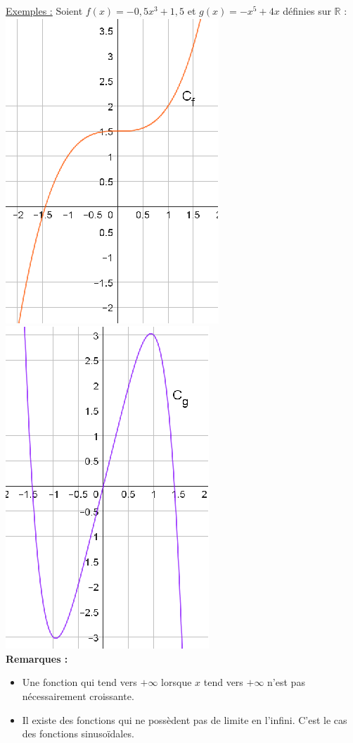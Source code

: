 \documentclass[a4paper,12pt,twoside,french]{extarticle}
\newcommand{\R}{\ensuremath{\mathbb{R}}\xspace}
\newcommand{\bi}{\begin{itemize}}
\newcommand{\ei}{\end{itemize}}
\newcommand{\rems }{ {\sffamily \textbf{Remarques : }}}
\begin{document}
\underline{Exemples :} Soient  $f(x)=-0,5x^3+1,5$ et $g(x)=-x^5+4x$ définies sur $\R$ :\\
\includegraphics[scale=1.7]{limiteinfineninfini1.eps} \hspace*{0.5cm} \includegraphics[scale=1.7]{limiteinfineninfini2.eps}\\

\rems
\bi
\item Une fonction qui tend vers  $+\infty$ lorsque $x$ tend vers  $+\infty$ n'est pas nécessairement croissante.
\item Il existe des fonctions qui ne possèdent pas de limite en l'infini. C'est le cas des fonctions sinusoïdales.
\ei
\end{document}
